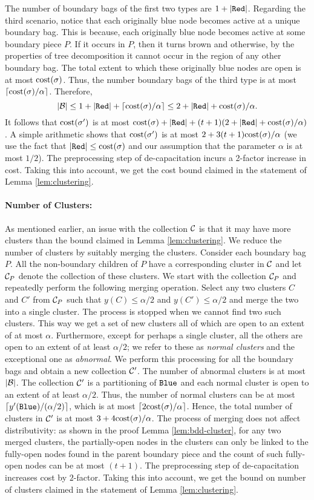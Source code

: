 \documentclass[11pt]{article}
\newcommand{\mysmallpara}[1] {\paragraph{#1:}}
\newcommand{\calC} {{\cal C}}
\newcommand{\myred} {{\tt Red}}
\newcommand{\myblue} {{\tt Blue}}
\newcommand{\cost} {{\rm cost}}
\newcommand{\calB} {{\cal B}}
\begin{document}
The number of boundary bags of the first two types are $1+|\myred|$.
Regarding the third scenario, notice that each originally blue node becomes active at a unique boundary bag.
This is because, each originally blue node becomes active at some boundary piece $P$.
If it occurs in $P$, then it turns brown and otherwise, by the properties of tree decomposition
it cannot occur in the region of any other boundary bag.
The total extent to which these originally blue nodes are open is at most $\cost(\sigma)$.
Thus, the number boundary bags of the third type is at most $\lceil \cost(\sigma)/\alpha \rceil$.
Therefore, 
\[
	|\calB| \leq 1 + |\myred| + \lceil\cost(\sigma)/\alpha\rceil \leq 2 + |\myred| + \cost(\sigma)/\alpha.
\]
It follows that $\cost(\sigma')$ is at most  $\cost(\sigma) + |\myred| + (t+1)(2 + |\myred| + \cost(\sigma)/\alpha)$.
A simple arithmetic shows that $\cost(\sigma')$ is at most $2+3(t+1)\cost(\sigma)/\alpha$
(we use the fact that $|\myred|\leq \cost(\sigma)$ and our assumption that 
the parameter $\alpha$ is at most $1/2$).
The preprocessing step of de-capacitation incurs a 2-factor increase in cost.
Taking this into account, we get the cost bound claimed in the statement of Lemma \ref{lem:clustering}.

\mysmallpara{Number of Clusters}
As mentioned earlier, an issue with the collection $\calC$ is that it may have more clusters than the bound claimed in Lemma \ref{lem:clustering}.
We reduce the number of clusters by suitably merging the clusters.
Consider each boundary bag $P$. 
All the non-boundary children of $P$ have a corresponding cluster in $\calC$
and let $\calC_P$ denote the collection of these clusters. 
We start with the collection $\calC_P$ and repeatedly perform the following merging operation.
Select any two clusters $C$ and $C'$ from $\calC_P$ such that 
$y(C)\leq \alpha/2$ and $y(C')\leq \alpha/2$ and merge the two into a single cluster.
The process is stopped when we cannot find two such clusters.
This way we get a set of new clusters all of which are open to an extent of at most $\alpha$.
Furthermore, except for perhaps a single cluster, all the others are open to an extent of at least $\alpha/2$;
we refer to these as {\em normal clusters} and the exceptional one as {\em abnormal}.
We perform this processing for all the boundary bags and obtain a new collection $\calC'$.
The number of abnormal clusters is at most $|\calB|$.
The collection $\calC'$ is a partitioning of $\myblue$ and each normal cluster is open to an extent of at least $\alpha/2$.
Thus, the number of normal clusters can be at most $\lceil y'(\myblue)/(\alpha/2)\rceil$,
which is at most $\lceil 2\cost(\sigma)/\alpha\rceil$.
Hence, the total number of clusters in $\calC'$ is at most $3 + 4 \cost(\sigma)/\alpha$.
The process of merging does not affect distributivity: as shown in the proof Lemma \ref{lem:bdd-cluster},
for any two merged clusters, the partially-open nodes in the clusters can only be linked to the fully-open 
nodes found in the parent boundary piece and the count of such fully-open nodes can be at most $(t+1)$.
The preprocessing step of de-capacitation increases cost by $2$-factor.
Taking this into account, we get the bound on number of clusters claimed in the statement of Lemma \ref{lem:clustering}.
\end{document}
